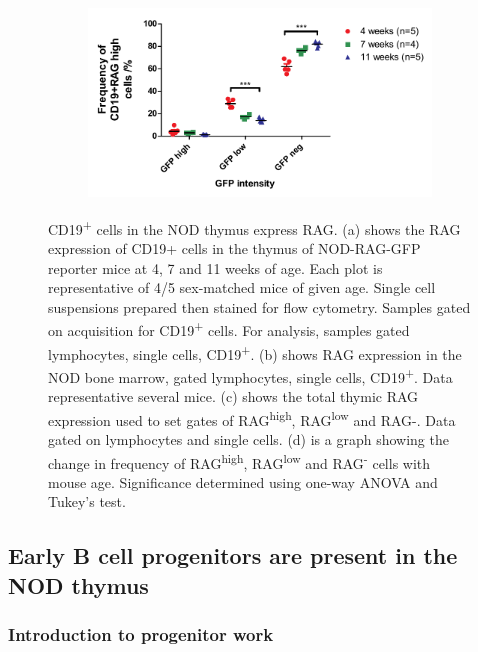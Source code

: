 \begin{figure}
\begin{subfigure}{0.5\textwidth}
	\caption{}
	\label{subfig:totalthyRAG}
	\end{subfigure}
	\begin{subfigure}{\textwidth}
	\includegraphics[width=\textwidth]{Figures/RAGhighlownegative.pdf}
	\caption{}
	\label{subfig:RAGhighlowneggraph}
	\end{subfigure}
\caption[Some CD19\textsuperscript{+} cells in the thymus appear to be expressing RAG]{CD19\textsuperscript{+} cells in the NOD thymus express RAG. 
(a) shows the RAG expression of CD19+ cells in the thymus of NOD-RAG-GFP reporter mice at 4, 7 and 11 weeks of age. Each plot is representative of 4/5 sex-matched mice of given age. Single cell suspensions prepared then stained for flow cytometry. Samples gated on acquisition for CD19\textsuperscript{+} cells. For analysis, samples gated lymphocytes, single cells, CD19\textsuperscript{+}. (b) shows RAG expression in the NOD bone marrow, gated lymphocytes, single cells, CD19\textsuperscript{+}. Data representative several mice. (c) shows the total thymic RAG expression used to set gates of RAG\textsuperscript{high}, RAG\textsuperscript{low} and RAG-. Data gated on lymphocytes and single cells. (d) is a graph showing the change in frequency of RAG\textsuperscript{high}, RAG\textsuperscript{low} and RAG\textsuperscript{-} cells with mouse age. Significance determined using one-way ANOVA and Tukey's test.} 
\end{figure}



\subsection{Early B cell progenitors are present in the NOD thymus}
\label{subsec:earlyprogens}

\subsubsection{Introduction to progenitor work}

